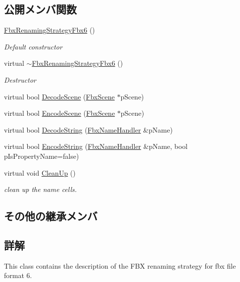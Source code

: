 \subsection*{公開メンバ関数}
\begin{DoxyCompactItemize}
\item 
\hyperlink{class_fbx_renaming_strategy_fbx6_a5a90e6b22bb9cb54515a5d39a1635794}{Fbx\+Renaming\+Strategy\+Fbx6} ()
\begin{DoxyCompactList}\small\item\em Default constructor \end{DoxyCompactList}\item 
virtual \hyperlink{class_fbx_renaming_strategy_fbx6_ac6a37d6fb8d2a7604db4b3ed10a834ce}{$\sim$\+Fbx\+Renaming\+Strategy\+Fbx6} ()
\begin{DoxyCompactList}\small\item\em Destructor \end{DoxyCompactList}\item 
virtual bool \hyperlink{class_fbx_renaming_strategy_fbx6_a663b913a3f88b49e847f9c9c99ab16f2}{Decode\+Scene} (\hyperlink{class_fbx_scene}{Fbx\+Scene} $\ast$p\+Scene)
\item 
virtual bool \hyperlink{class_fbx_renaming_strategy_fbx6_a24a48914e694f5bada3b0604a4dc62bf}{Encode\+Scene} (\hyperlink{class_fbx_scene}{Fbx\+Scene} $\ast$p\+Scene)
\item 
virtual bool \hyperlink{class_fbx_renaming_strategy_fbx6_a491fb1e1fe7f2d194059f83f49be9e19}{Decode\+String} (\hyperlink{class_fbx_name_handler}{Fbx\+Name\+Handler} \&p\+Name)
\item 
virtual bool \hyperlink{class_fbx_renaming_strategy_fbx6_aee897659c210920eefbcb899b8b463d6}{Encode\+String} (\hyperlink{class_fbx_name_handler}{Fbx\+Name\+Handler} \&p\+Name, bool p\+Is\+Property\+Name=false)
\item 
virtual void \hyperlink{class_fbx_renaming_strategy_fbx6_acb37bd5bc46fdf1e4bf77d3db6654d45}{Clean\+Up} ()
\begin{DoxyCompactList}\small\item\em clean up the name cells. \end{DoxyCompactList}\end{DoxyCompactItemize}
\subsection*{その他の継承メンバ}


\subsection{詳解}
This class contains the description of the F\+BX renaming strategy for fbx file format 6. 

